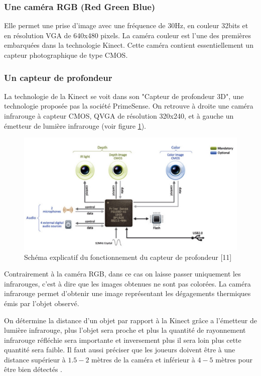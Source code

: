 \documentclass[12pt,a4paper,oneside]{book}
\begin{document}
	\subsubsection{Une caméra RGB (Red Green Blue)}
	Elle permet une prise d'image avec une fréquence de 30Hz, en couleur 32bits et en résolution VGA de 640x480 pixels. La caméra couleur est l'une des premières embarquées dans la technologie Kinect. Cette caméra contient essentiellement un capteur photographique de type CMOS.
	
	\subsubsection{Un capteur de profondeur}
	La technologie de la Kinect se voit dans son "Capteur de profondeur 3D", une technologie proposée pas la société PrimeSense. On retrouve à droite une caméra infrarouge à capteur CMOS, QVGA de résolution 320x240, et à gauche un émetteur de lumière infrarouge (voir figure \ref{fig1e5}).
	
	\begin{figure}[H]
		\centering
		\includegraphics[scale=0.4]{images/composantkinect.png}
		\caption{Schéma explicatif du fonctionnement du capteur de profondeur \textcolor[rgb]{1.00,0.00,0.00}{[11]} }
		\label{fig1e5}
	\end{figure}
	
	
	Contrairement à la caméra RGB, dans ce cas on laisse passer uniquement les infrarouges, c'est à dire que les images obtenues ne sont pas colorées. La caméra infrarouge permet d'obtenir une image représentant les dégagements thermiques émis par l'objet observé.
	
	On détermine la distance d'un objet par rapport à la Kinect grâce a l'émetteur de lumière infrarouge, plus l'objet sera proche et plus la quantité de rayonnement infrarouge réfléchie sera importante et inversement plus il sera loin plus cette quantité sera faible. Il faut aussi préciser que les joueurs doivent être à une distance supérieur à $1.5-2$ mètres de la caméra et inférieur à $4-5$ mètres pour être bien détectés .
	
\end{document}
